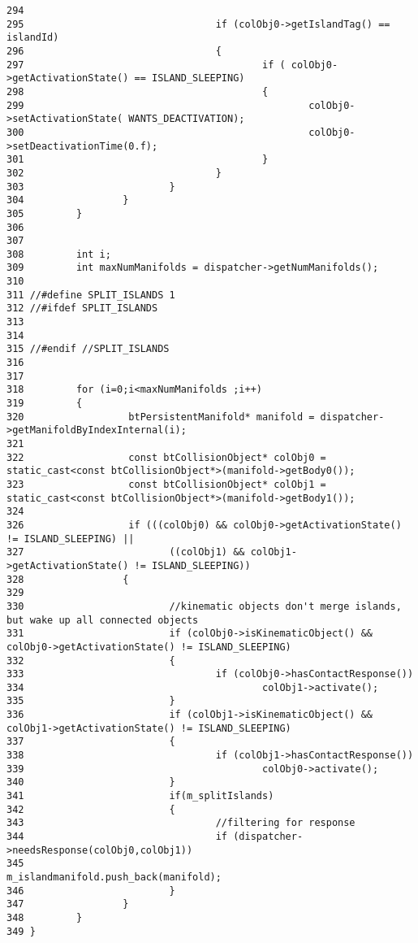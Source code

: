 \begin{Code}
\begin{verbatim}
294 
295                                 if (colObj0->getIslandTag() == islandId)
296                                 {
297                                         if ( colObj0->getActivationState() == ISLAND_SLEEPING)
298                                         {
299                                                 colObj0->setActivationState( WANTS_DEACTIVATION);
300                                                 colObj0->setDeactivationTime(0.f);
301                                         }
302                                 }
303                         }
304                 }
305         }
306 
307         
308         int i;
309         int maxNumManifolds = dispatcher->getNumManifolds();
310 
311 //#define SPLIT_ISLANDS 1
312 //#ifdef SPLIT_ISLANDS
313 
314         
315 //#endif //SPLIT_ISLANDS
316 
317         
318         for (i=0;i<maxNumManifolds ;i++)
319         {
320                  btPersistentManifold* manifold = dispatcher->getManifoldByIndexInternal(i);
321                  
322                  const btCollisionObject* colObj0 = static_cast<const btCollisionObject*>(manifold->getBody0());
323                  const btCollisionObject* colObj1 = static_cast<const btCollisionObject*>(manifold->getBody1());
324                 
326                  if (((colObj0) && colObj0->getActivationState() != ISLAND_SLEEPING) ||
327                         ((colObj1) && colObj1->getActivationState() != ISLAND_SLEEPING))
328                 {
329                 
330                         //kinematic objects don't merge islands, but wake up all connected objects
331                         if (colObj0->isKinematicObject() && colObj0->getActivationState() != ISLAND_SLEEPING)
332                         {
333                                 if (colObj0->hasContactResponse())
334                                         colObj1->activate();
335                         }
336                         if (colObj1->isKinematicObject() && colObj1->getActivationState() != ISLAND_SLEEPING)
337                         {
338                                 if (colObj1->hasContactResponse())
339                                         colObj0->activate();
340                         }
341                         if(m_splitIslands)
342                         { 
343                                 //filtering for response
344                                 if (dispatcher->needsResponse(colObj0,colObj1))
345                                         m_islandmanifold.push_back(manifold);
346                         }
347                 }
348         }
349 }
\end{verbatim}
\end{Code}





